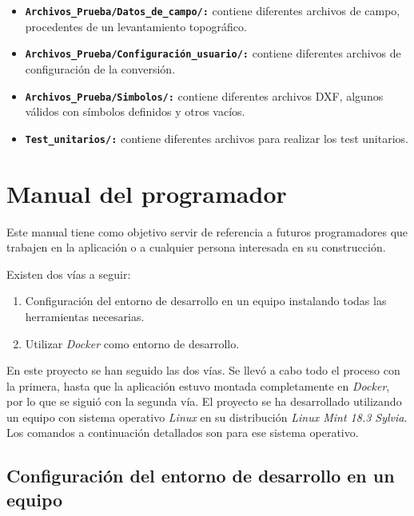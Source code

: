 \begin{itemize}
\item \texttt{\textbf{Archivos\_Prueba/Datos\_de\_campo/:}} contiene diferentes archivos de campo, procedentes de un levantamiento topográfico.

\item \texttt{\textbf{Archivos\_Prueba/Configuración\_usuario/:}} contiene diferentes archivos de configuración de la conversión.

\item \texttt{\textbf{Archivos\_Prueba/Simbolos/:}} contiene diferentes archivos DXF, algunos válidos con símbolos definidos y otros vacíos.

\item \texttt{\textbf{Test\_unitarios/:}} contiene diferentes archivos para realizar los test unitarios.

\end{itemize}


\section{Manual del programador}

Este manual tiene como objetivo servir de referencia a futuros programadores que trabajen en la aplicación o a cualquier persona interesada en su construcción. 

Existen dos vías a seguir:

\begin{enumerate}

\item Configuración del entorno de desarrollo en un equipo instalando todas las herramientas necesarias. 

\item Utilizar \emph{Docker} como entorno de desarrollo. 

\end{enumerate}

En este proyecto se han seguido las dos vías. Se llevó a cabo todo el proceso con la primera, hasta que la aplicación estuvo montada completamente en \emph{Docker}, por lo que se siguió con la segunda vía. 
El proyecto se ha desarrollado utilizando un equipo con sistema operativo \emph{Linux} en su distribución \emph{Linux Mint 18.3 Sylvia}. Los comandos a continuación detallados son para ese sistema operativo.

\subsection{Configuración del entorno de desarrollo en un equipo}

